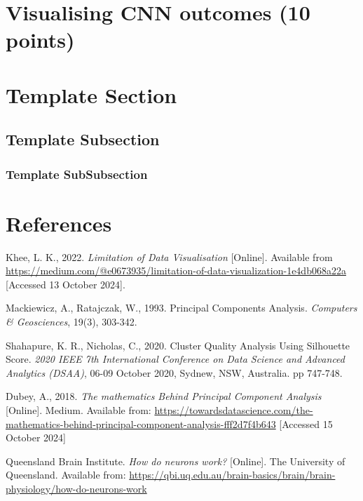 \documentclass{article}
\begin{document}
\section{Visualising CNN outcomes (10 points)}


\section{Template Section}
\subsection{Template Subsection}
\subsubsection{Template SubSubsection}



\section{References}

Khee, L. K., 2022. \textit{Limitation of Data Visualisation} [Online]. Available from 
\href{https://medium.com/@e0673935/limitation-of-data-visualization-1e4db068a22a}{https://medium.com/@e0673935/limitation-of-data-visualization-1e4db068a22a} [Accessed 13 October 2024]. \newline

\noindent
Mackiewicz, A., Ratajczak, W., 1993. Principal Components Analysis. \textit{Computers \& Geosciences}, 19(3), 303-342. \newline

\noindent
Shahapure, K. R., Nicholas, C., 2020. Cluster Quality Analysis Using Silhouette Score. \textit{2020 IEEE 7th International Conference on Data Science and Advanced Analytics (DSAA)}, 06-09 October 2020, Sydnew, NSW, Australia. pp 747-748.

\noindent
Dubey, A., 2018. \textit{The mathematics Behind Principal Component Analysis} [Online]. Medium. Available from: \href{https://towardsdatascience.com/the-mathematics-behind-principal-component-analysis-fff2d7f4b643}{https://towardsdatascience.com/the-mathematics-behind-principal-component-analysis-fff2d7f4b643} [Accessed 15 October 2024]

\noindent
Queensland Brain Institute. \textit{How do neurons work?} [Online]. The University of Queensland. Available from: \href{https://qbi.uq.edu.au/brain-basics/brain/brain-physiology/how-do-neurons-work}{https://qbi.uq.edu.au/brain-basics/brain/brain-physiology/how-do-neurons-work}
\end{document}
